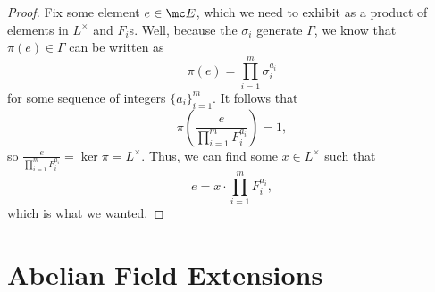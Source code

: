 \documentclass{article}
\numberwithin{equation}{section}
\begin{document}
\begin{proof}
	Fix some element $e\in\mc E$, which we need to exhibit as a product of elements in $L^\times$ and $F_i$s. Well, because the $\sigma_i$ generate $\Gamma$, we know that $\pi(e)\in\Gamma$ can be written as
	\[\pi(e)=\prod_{i=1}^m\sigma_i^{a_i}\]
	for some sequence of integers $\{a_i\}_{i=1}^m$. It follows that
	\[\pi\left(\frac e{\prod_{i=1}^mF_i^{a_i}}\right)=1,\]
	so $\frac e{\prod_{i=1}^mF_i^{a_i}}=\ker\pi=L^\times$. Thus, we can find some $x\in L^\times$ such that
	\[e=x\cdot\prod_{i=1}^mF_i^{a_i},\]
	which is what we wanted.
\end{proof}

\section{Abelian Field Extensions}
\end{document}
